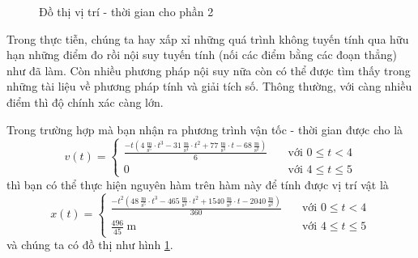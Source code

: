 \documentclass[a4paper, titlepage, openany]{book}
\numberwithin{equation}{chapter}
\begin{document}
\begin{figure}[h!]
   \centering
   \caption{Đồ thị vị trí - thời gian cho phần 2}
   \label{fig:vttgp2}
\end{figure}

Trong thực tiễn, chúng ta hay xấp xỉ những quá trình không tuyến tính qua hữu hạn những điểm đo rồi nội suy tuyến tính (nối các điểm bằng các đoạn thẳng) như đã làm. Còn nhiều phương pháp nội suy nữa còn có thể được tìm thấy trong những tài liệu về phương pháp tính và giải tích số. Thông thường, với càng nhiều điểm thì độ chính xác càng lớn.

Trong trường hợp mà bạn nhận ra phương trình vận tốc - thời gian được cho là
\begin{equation*}
   v(t) =
   \begin{cases}
      \displaystyle \frac{\displaystyle -t\left(4\ \frac{\text{m}}{\text{s}^5}\cdot t^3-31\ \frac{\text{m}}{\text{s}^4}\cdot t^2+77\ \frac{\text{m}}{\text{s}^3}\cdot t-68\ \frac{\text{m}}{\text{s}^2}\right)}{6} &\quad \text{với } 0 \leq t < 4 \\
      0&\quad \text{với } 4 \leq t \leq 5
   \end{cases}
\end{equation*}
thì bạn có thể thực hiện nguyên hàm trên hàm này để tính được vị trí vật là
\begin{equation*}
   \displaystyle 
   x(t) =
   \begin{cases}
      \displaystyle \frac{\displaystyle -t^2\left(48\ \frac{\text{m}}{\text{s}^5}\cdot t^3-465\ \frac{\text{m}}{\text{s}^4}\cdot t^2+1540\ \frac{\text{m}}{\text{s}^3}\cdot t-2040\ \frac{\text{m}}{\text{s}^2}\right)}{360} &\quad \text{với } 0 \leq t < 4 \\
      \displaystyle \frac{496}{45}\ \text{m}&\quad \text{với } 4 \leq t \leq 5
   \end{cases}
\end{equation*}
và chúng ta có đồ thị như hình \ref{fig:vttgp2}.
\end{document}
